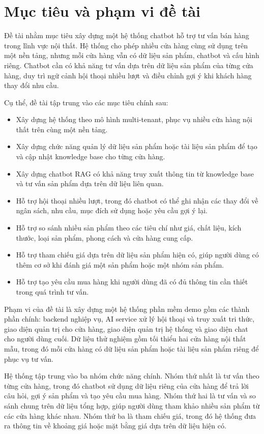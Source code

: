 \documentclass[../DoAn.tex]{subfiles}
\begin{document}
\section{Mục tiêu và phạm vi đề tài}
\label{section:1.2}

Đề tài nhằm mục tiêu xây dựng một hệ thống chatbot hỗ trợ tư vấn bán hàng trong lĩnh vực nội thất. Hệ thống cho phép nhiều cửa hàng cùng sử dụng trên một nền tảng, nhưng mỗi cửa hàng vẫn có dữ liệu sản phẩm, chatbot và cấu hình riêng. Chatbot cần có khả năng tư vấn dựa trên dữ liệu sản phẩm của từng cửa hàng, duy trì ngữ cảnh hội thoại nhiều lượt và điều chỉnh gợi ý khi khách hàng thay đổi nhu cầu.

Cụ thể, đề tài tập trung vào các mục tiêu chính sau:

\begin{itemize}
    \item Xây dựng hệ thống theo mô hình multi-tenant, phục vụ nhiều cửa hàng nội thất trên cùng một nền tảng.
    \item Xây dựng chức năng quản lý dữ liệu sản phẩm hoặc tài liệu sản phẩm để tạo và cập nhật knowledge base cho từng cửa hàng.
    \item Xây dựng chatbot RAG có khả năng truy xuất thông tin từ knowledge base và tư vấn sản phẩm dựa trên dữ liệu liên quan.
    \item Hỗ trợ hội thoại nhiều lượt, trong đó chatbot có thể ghi nhận các thay đổi về ngân sách, nhu cầu, mục đích sử dụng hoặc yêu cầu gợi ý lại.
    \item Hỗ trợ so sánh nhiều sản phẩm theo các tiêu chí như giá, chất liệu, kích thước, loại sản phẩm, phong cách và cửa hàng cung cấp.
    \item Hỗ trợ tham chiếu giá dựa trên dữ liệu sản phẩm hiện có, giúp người dùng có thêm cơ sở khi đánh giá một sản phẩm hoặc một nhóm sản phẩm.
    \item Hỗ trợ tạo yêu cầu mua hàng khi người dùng đã có đủ thông tin cần thiết trong quá trình tư vấn.
\end{itemize}

Phạm vi của đề tài là xây dựng một hệ thống phần mềm demo gồm các thành phần chính: backend nghiệp vụ, AI service xử lý hội thoại và truy xuất tri thức, giao diện quản trị cho cửa hàng, giao diện quản trị hệ thống và giao diện chat cho người dùng cuối. Dữ liệu thử nghiệm gồm tối thiểu hai cửa hàng nội thất mẫu, trong đó mỗi cửa hàng có dữ liệu sản phẩm hoặc tài liệu sản phẩm riêng để phục vụ tư vấn.

Hệ thống tập trung vào ba nhóm chức năng chính. Nhóm thứ nhất là tư vấn theo từng cửa hàng, trong đó chatbot sử dụng dữ liệu riêng của cửa hàng để trả lời câu hỏi, gợi ý sản phẩm và tạo yêu cầu mua hàng. Nhóm thứ hai là tư vấn và so sánh chung trên dữ liệu tổng hợp, giúp người dùng tham khảo nhiều sản phẩm từ các cửa hàng khác nhau. Nhóm thứ ba là tham chiếu giá, trong đó hệ thống đưa ra thông tin về khoảng giá hoặc mặt bằng giá dựa trên dữ liệu hiện có.
\end{document}
